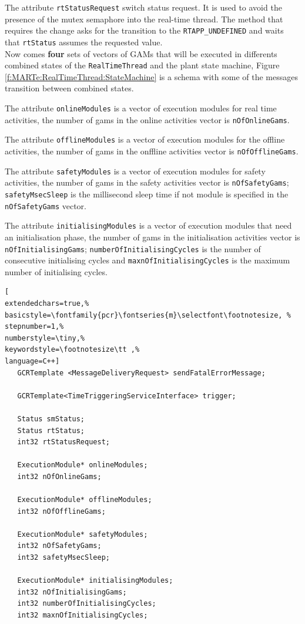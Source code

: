 The attribute \texttt{rtStatusRequest} switch status request. It is used to avoid the presence of the mutex semaphore into the real-time thread. The method that requires the change asks for the transition to the \texttt{RTAPP\_UNDEFINED} and waits that \texttt{rtStatus} assumes the requested value. \\


Now comes \textbf{four} sets of vectors of GAMs that will be executed in differents combined states of the \texttt{RealTimeThread} and the plant state machine, Figure \ref{f:MARTe:RealTimeThread:StateMachine} is a schema with some of the messages transition between combined states.

The attribute \texttt{onlineModules} is a vector of execution modules for real time activities, the number of gams in the online activities vector is \texttt{nOfOnlineGams}.

The attribute \texttt{offlineModules} is a vector of execution modules for the offline activities, the number of gams in the onffline activities vector is \texttt{nOfOfflineGams}.

The attribute \texttt{safetyModules} is a vector of execution modules for safety activities, the number of gams in the safety activities vector is \texttt{nOfSafetyGams}; \texttt{safetyMsecSleep} is the millisecond sleep time if not module is specified in the \texttt{nOfSafetyGams} vector.

The attribute \texttt{initialisingModules} is a vector of execution modules that need an initialisation phase, the number of gams in the initialisation activities vector is \texttt{nOfInitialisingGams}; \texttt{numberOfInitialisingCycles} is the number of consecutive initialising cycles and \texttt{maxnOfInitialisingCycles} is the maximum number of initialising cycles. \\

\begin{lstlisting}[
extendedchars=true,%
basicstyle=\fontfamily{pcr}\fontseries{m}\selectfont\footnotesize, %
stepnumber=1,%
numberstyle=\tiny,%
keywordstyle=\footnotesize\tt ,%
language=C++]
   GCRTemplate <MessageDeliveryRequest> sendFatalErrorMessage;

   GCRTemplate<TimeTriggeringServiceInterface> trigger;

   Status smStatus;
   Status rtStatus;
   int32 rtStatusRequest;

   ExecutionModule* onlineModules;
   int32 nOfOnlineGams;

   ExecutionModule* offlineModules;
   int32 nOfOfflineGams;

   ExecutionModule* safetyModules;
   int32 nOfSafetyGams;
   int32 safetyMsecSleep;

   ExecutionModule* initialisingModules;
   int32 nOfInitialisingGams;
   int32 numberOfInitialisingCycles;
   int32 maxnOfInitialisingCycles;
\end{lstlisting}



